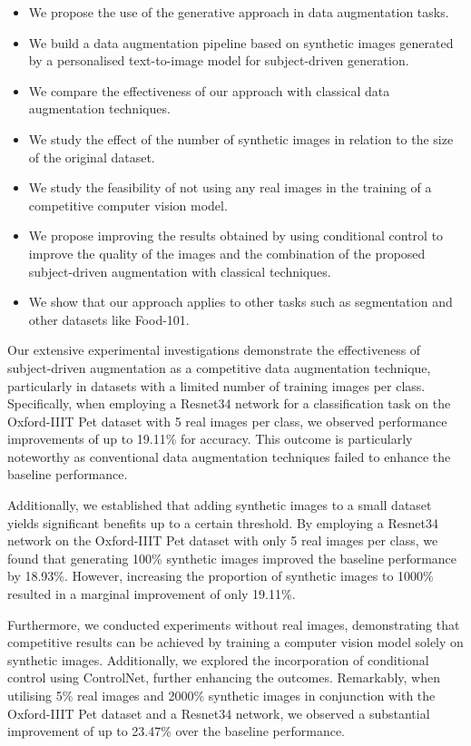 \begin{itemize}
    \item We propose the use of the generative approach in data augmentation tasks.  
    \item We build a data augmentation pipeline based on synthetic images generated by a personalised text-to-image model for subject-driven generation.
    \item We compare the effectiveness of our approach with classical data augmentation techniques.
    \item We study the effect of the number of synthetic images in relation to the size of the original dataset.
    \item We study the feasibility of not using any real images in the training of a competitive computer vision model.
    \item We propose improving the results obtained by using conditional control to improve the quality of the images and the combination of the proposed subject-driven augmentation with classical techniques.
    \item We show that our approach applies to other tasks such as segmentation and other datasets like Food-101.
\end{itemize}

Our extensive experimental investigations demonstrate the effectiveness of subject-driven augmentation as a competitive data augmentation technique, particularly in datasets with a limited number of training images per class. Specifically, when employing a Resnet34 network for a classification task on the Oxford-IIIT Pet dataset with 5 real images per class, we observed performance improvements of up to 19.11\% for accuracy. This outcome is particularly noteworthy as conventional data augmentation techniques failed to enhance the baseline performance.

Additionally, we established that adding synthetic images to a small dataset yields significant benefits up to a certain threshold. By employing a Resnet34 network on the Oxford-IIIT Pet dataset with only 5 real images per class, we found that generating 100\% synthetic images improved the baseline performance by 18.93\%. However, increasing the proportion of synthetic images to 1000\% resulted in a marginal improvement of only 19.11\%.

Furthermore, we conducted experiments without real images, demonstrating that competitive results can be achieved by training a computer vision model solely on synthetic images. Additionally, we explored the incorporation of conditional control using ControlNet, further enhancing the outcomes. Remarkably, when utilising 5\% real images and 2000\% synthetic images in conjunction with the Oxford-IIIT Pet dataset and a Resnet34 network, we observed a substantial improvement of up to 23.47\% over the baseline performance.

